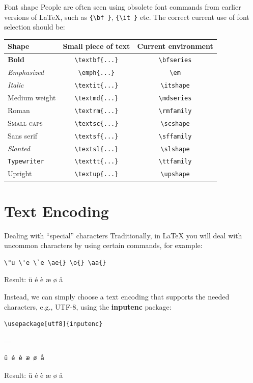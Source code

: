 \documentclass[english]{beamer}
\begin{document}
\begin{frame}[fragile]{\insertsection}{Font shape}
  People are often seen using obsolete font commands from earlier
  versions of LaTeX, such as \verb|{\bf }|, \verb|{\it }| etc. The
  correct current use of font selection should be:
  \begin{table}
    \centering
    \begin{tabular}{lcc}
      Shape & Small piece of text & Current environment\\
      \midrule
      \textbf{Bold}          & \verb|\textbf{...}| & \verb|\bfseries| \\ 
      \emph{Emphasized}      & \verb|\emph{...}|   & \verb|\em|       \\ 
      \textit{Italic}        & \verb|\textit{...}| & \verb|\itshape|  \\ 
      \textmd{Medium weight} & \verb|\textmd{...}| & \verb|\mdseries| \\ 
      \textrm{Roman}         & \verb|\textrm{...}| & \verb|\rmfamily| \\ 
      \textsc{Small caps}    & \verb|\textsc{...}| & \verb|\scshape|  \\ 
      \textsf{Sans serif}    & \verb|\textsf{...}| & \verb|\sffamily| \\ 
      \textsl{Slanted}       & \verb|\textsl{...}| & \verb|\slshape|  \\ 
      \texttt{Typewriter}    & \verb|\texttt{...}| & \verb|\ttfamily| \\ 
      \textup{Upright}       & \verb|\textup{...}| & \verb|\upshape| 
    \end{tabular}
  \end{table}
\end{frame}

\section{Text Encoding}

\begin{frame}[fragile]{\insertsection}{Dealing with ``special''
    characters}
  Traditionally, in \LaTeX{} you will deal with uncommon characters by
  using certain commands, for example:
\begin{verbatim}
\"u \'e \`e \ae{} \o{} \aa{}
\end{verbatim}
  Result: \"u \'e \`e \ae{} \o{} \aa{}

  Instead, we can simply choose a text encoding that supports the
  needed characters, e.g., UTF-8, using the \textbf{inputenc} package:
\begin{verbatim}
\usepackage[utf8]{inputenc}
\end{verbatim}
  ---
\begin{verbatim}
ü é è æ ø å
\end{verbatim}
  Result: ü é è æ ø å
\end{frame}
\end{document}
